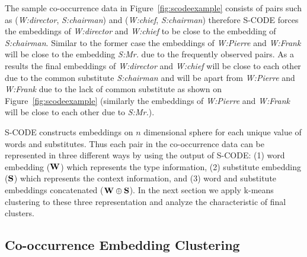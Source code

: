 
The sample co-occurrence data in Figure~\ref{fig:scodeexample}
consists of pairs such as (\textit{W:director}, \textit{S:chairman})
and (\textit{W:chief}, \textit{S:chairman}) therefore S-CODE forces
the embeddings of \textit{W:director} and \textit{W:chief} to be close
to the embedding of \textit{S:chairman}.  Similar to the former case
the embeddings of \textit{W:Pierre} and \textit{W:Frank} will be close
to the embedding \textit{S:Mr.} due to the frequently observed pairs.
As a results the final embeddings of \textit{W:director} and
\textit{W:chief} will be close to each other due to the common
substitute \textit{S:chairman} and will be apart from
\textit{W:Pierre} and \textit{W:Frank} due to the lack of common
substitute as shown on Figure~\ref{fig:scodeexample} (similarly the
embeddings of \textit{W:Pierre} and \textit{W:Frank} will be close to
each other due to \textit{S:Mr.}).

S-CODE constructs embeddings on $n$ dimensional sphere for each unique
value of words and substitutes.  Thus each pair in the co-occurrence
data can be represented in three different ways by using the output of
S-CODE: (1) word embedding (${\bf W}$) which represents the type
information, (2) substitute embedding (${\bf S}$) which represents the
context information, and (3) word and substitute embeddings
concatenated (${\bf W}\oplus{\bf S}$).  In the next section we apply
k-means clustering to these three representation and analyze the
characteristic of final clusters.

\subsection{Co-occurrence Embedding Clustering}
\label{sec:clustering}

